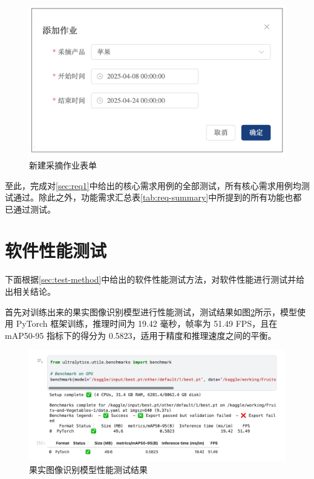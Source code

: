 \begin{figure}
    \centering
    \includegraphics[width=0.8\linewidth]{../result/form-new-work.png}
    \caption{新建采摘作业表单}
    \label{fig:form-new-work}
\end{figure}

至此，完成对\ref{sec:req1}中给出的核心需求用例的全部测试，所有核心需求用例均测试通过。除此之外，功能需求汇总表\ref{tab:req-summary}中所提到的所有功能也都已通过测试。

\section{软件性能测试}\label{sec:test-perf}

下面根据\ref{sec:test-method}中给出的软件性能测试方法，对软件性能进行测试并给出相关结论。

首先对训练出来的果实图像识别模型进行性能测试，测试结果如图\ref{fig:model-benchmark}所示，模型使用 PyTorch 框架训练，推理时间为 19.42 毫秒，帧率为 51.49 FPS，且在 mAP50-95 指标下的得分为 0.5823，适用于精度和推理速度之间的平衡。

\begin{figure}
    \centering
    \includegraphics[width=0.95\linewidth]{../source/aws-img/yolov8/benchmark.png}
    \caption{果实图像识别模型性能测试结果}
    \label{fig:model-benchmark}
\end{figure}

